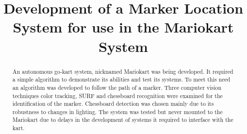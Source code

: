 \title{Development of a Marker Location System for use in the Mariokart System}

\author{

  \vspace{0.5\baselineskip}


  \vspace{0.5\baselineskip}


  \vspace{0.5\baselineskip}

}

\maketitle

\begin{abstract}
  An autonomous go-kart system, nicknamed Mariokart was being developed. It required a simple algorithm to demonstrate its abilities and test its systems. To meet this need an algorithm was developed to follow the path of a marker. Three computer vision techniques color tracking, SURF and chessboard recognition were examined for the identification of the marker. Chessboard detection was chosen mainly due to its robustness to changes in lighting. The system was tested but never mounted to the Mariokart due to delays in the development of systems it required to interface with the kart.
\end{abstract}
